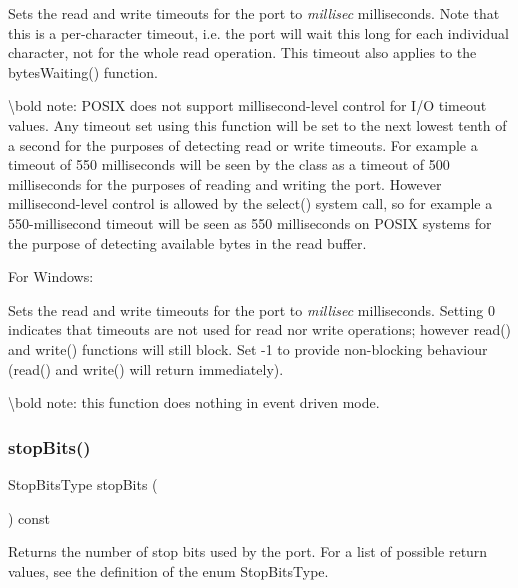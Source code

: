 Sets the read and write timeouts for the port to {\itshape millisec} milliseconds. Note that this is a per-\/character timeout, i.\+e. the port will wait this long for each individual character, not for the whole read operation. This timeout also applies to the bytes\+Waiting() function.

\textbackslash{}bold note\+: P\+O\+S\+IX does not support millisecond-\/level control for I/O timeout values. Any timeout set using this function will be set to the next lowest tenth of a second for the purposes of detecting read or write timeouts. For example a timeout of 550 milliseconds will be seen by the class as a timeout of 500 milliseconds for the purposes of reading and writing the port. However millisecond-\/level control is allowed by the select() system call, so for example a 550-\/millisecond timeout will be seen as 550 milliseconds on P\+O\+S\+IX systems for the purpose of detecting available bytes in the read buffer.

For Windows\+:

Sets the read and write timeouts for the port to {\itshape millisec} milliseconds. Setting 0 indicates that timeouts are not used for read nor write operations; however read() and write() functions will still block. Set -\/1 to provide non-\/blocking behaviour (read() and write() will return immediately).

\textbackslash{}bold note\+: this function does nothing in event driven mode. \mbox{\label{class_qext_serial_port_ac555d2bc67a6f1a4f389c54f3a3d5f60}} 
\subsubsection{\texorpdfstring{stopBits()}{stopBits()}}
{\footnotesize\ttfamily Stop\+Bits\+Type stop\+Bits (\begin{DoxyParamCaption}{ }\end{DoxyParamCaption}) const}

Returns the number of stop bits used by the port. For a list of possible return values, see the definition of the enum Stop\+Bits\+Type. \mbox{\label{class_qext_serial_port_acb7598e14f929c0fcf64ba2b71673e5d}} 
